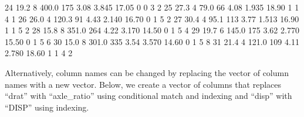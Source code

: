 \documentclass[
]{book}
\newenvironment{Shaded}{\begin{snugshade}}{\end{snugshade}}
\newcommand{\DecValTok}[1]{\textcolor[rgb]{0.00,0.00,0.81}{#1}}
\newcommand{\FloatTok}[1]{\textcolor[rgb]{0.00,0.00,0.81}{#1}}
\begin{document}
\begin{Shaded}
\begin{Highlighting}[]
\DecValTok{24}  \FloatTok{19.2}         \DecValTok{8}  \FloatTok{400.0}  \DecValTok{175}  \FloatTok{3.08}  \FloatTok{3.845}  \FloatTok{17.05}   \DecValTok{0}   \DecValTok{0}     \DecValTok{3}     \DecValTok{2}
\DecValTok{25}  \FloatTok{27.3}         \DecValTok{4}   \FloatTok{79.0}   \DecValTok{66}  \FloatTok{4.08}  \FloatTok{1.935}  \FloatTok{18.90}   \DecValTok{1}   \DecValTok{1}     \DecValTok{4}     \DecValTok{1}
\DecValTok{26}  \FloatTok{26.0}         \DecValTok{4}  \FloatTok{120.3}   \DecValTok{91}  \FloatTok{4.43}  \FloatTok{2.140}  \FloatTok{16.70}   \DecValTok{0}   \DecValTok{1}     \DecValTok{5}     \DecValTok{2}
\DecValTok{27}  \FloatTok{30.4}         \DecValTok{4}   \FloatTok{95.1}  \DecValTok{113}  \FloatTok{3.77}  \FloatTok{1.513}  \FloatTok{16.90}   \DecValTok{1}   \DecValTok{1}     \DecValTok{5}     \DecValTok{2}
\DecValTok{28}  \FloatTok{15.8}         \DecValTok{8}  \FloatTok{351.0}  \DecValTok{264}  \FloatTok{4.22}  \FloatTok{3.170}  \FloatTok{14.50}   \DecValTok{0}   \DecValTok{1}     \DecValTok{5}     \DecValTok{4}
\DecValTok{29}  \FloatTok{19.7}         \DecValTok{6}  \FloatTok{145.0}  \DecValTok{175}  \FloatTok{3.62}  \FloatTok{2.770}  \FloatTok{15.50}   \DecValTok{0}   \DecValTok{1}     \DecValTok{5}     \DecValTok{6}
\DecValTok{30}  \FloatTok{15.0}         \DecValTok{8}  \FloatTok{301.0}  \DecValTok{335}  \FloatTok{3.54}  \FloatTok{3.570}  \FloatTok{14.60}   \DecValTok{0}   \DecValTok{1}     \DecValTok{5}     \DecValTok{8}
\DecValTok{31}  \FloatTok{21.4}         \DecValTok{4}  \FloatTok{121.0}  \DecValTok{109}  \FloatTok{4.11}  \FloatTok{2.780}  \FloatTok{18.60}   \DecValTok{1}   \DecValTok{1}     \DecValTok{4}     \DecValTok{2}
\end{Highlighting}
\end{Shaded}

Alternatively, column names can be changed by replacing the vector of column names with a new vector. Below, we create a vector of columns that replaces ``drat'' with ``axle\_ratio'' using conditional match and indexing and ``disp'' with ``DISP'' using indexing.
\end{document}
